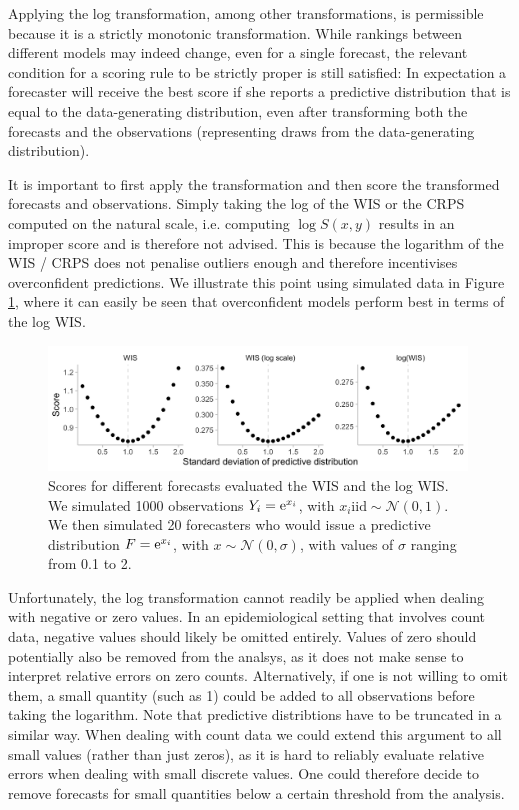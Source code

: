 \documentclass{article}
\begin{document}
Applying the log transformation, among other transformations, is permissible because it is a strictly monotonic transformation. While rankings between different models may indeed change, even for a single forecast, the relevant condition for a scoring rule to be strictly proper is still satisfied: In expectation a forecaster will receive the best score if she reports a predictive distribution that is equal to the data-generating distribution, even after transforming both the forecasts and the observations (representing draws from the data-generating distribution). 

It is important to first apply the transformation and then score the transformed forecasts and observations. Simply taking the log of the WIS or the CRPS computed on the natural scale, i.e. computing $\log S(x, y)$ results in an improper score and is therefore not advised. This is because the logarithm of the WIS / CRPS does not penalise outliers enough and therefore incentivises overconfident predictions. We illustrate this point using simulated data in Figure \ref{fig:log-improper}, where it can easily be seen that overconfident models perform best in terms of the log WIS. 

\begin{figure}[h!]
    \centering
    \includegraphics[width=0.99\textwidth]{output/figures/example-log-first.png}
    \caption{Scores for different forecasts evaluated the WIS and the log WIS. We simulated 1000 observations $Y_i = {\rm e}^{x_i}$, with $x_i \text{iid} \sim \mathcal{N}(0, 1)$. We then simulated 20 forecasters who would issue a predictive distribution $F = {\rm e}^{x_i}$, with $x \sim \mathcal{N}(0, \sigma)$, with values of $\sigma$ ranging from 0.1 to 2.}
    \label{fig:log-improper}
\end{figure}


Unfortunately, the log transformation cannot readily be applied when dealing with negative or zero values. In an epidemiological setting that involves count data, negative values should likely be omitted entirely. Values of zero should potentially also be removed from the analsys, as it does not make sense to interpret relative errors on zero counts. Alternatively, if one is not willing to omit them, a small quantity (such as 1) could be added to all observations before taking the logarithm. Note that predictive distribtions have to be truncated in a similar way. When dealing with count data we could extend this argument to all small values (rather than just zeros), as it is hard to reliably evaluate relative errors when dealing with small discrete values. One could therefore decide to remove forecasts for small quantities below a certain threshold from the analysis. 
\end{document}
